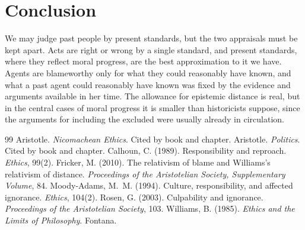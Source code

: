 \documentclass{situationist-preprint}
\begin{document}
\section{Conclusion}

We may judge past people by present standards, but the two appraisals must be kept apart. Acts are right or wrong by a single standard, and present standards, where they reflect moral progress, are the best approximation to it we have. Agents are blameworthy only for what they could reasonably have known, and what a past agent could reasonably have known was fixed by the evidence and arguments available in her time. The allowance for epistemic distance is real, but in the central cases of moral progress it is smaller than historicists suppose, since the arguments for including the excluded were usually already in circulation.

\begin{thebibliography}{99}\small
{} Aristotle. \emph{Nicomachean Ethics}. Cited by book and chapter.
 Aristotle. \emph{Politics}. Cited by book and chapter.
 Calhoun, C. (1989). Responsibility and reproach. \emph{Ethics}, 99(2).
 Fricker, M. (2010). The relativism of blame and Williams's relativism of distance. \emph{Proceedings of the Aristotelian Society, Supplementary Volume}, 84.
 Moody-Adams, M.~M. (1994). Culture, responsibility, and affected ignorance. \emph{Ethics}, 104(2).
 Rosen, G. (2003). Culpability and ignorance. \emph{Proceedings of the Aristotelian Society}, 103.
 Williams, B. (1985). \emph{Ethics and the Limits of Philosophy}. Fontana.
\end{thebibliography}
\end{document}
